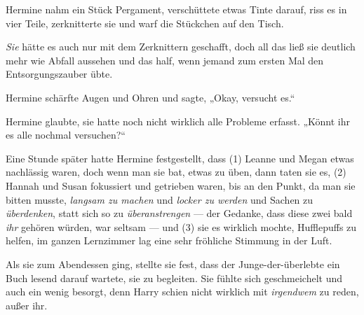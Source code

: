 Hermine nahm ein Stück Pergament, verschüttete etwas Tinte darauf, riss es in vier Teile, zerknitterte sie und warf die Stückchen auf den Tisch.

\emph{Sie} hätte es auch nur mit dem Zerknittern geschafft, doch all das ließ sie deutlich mehr wie Abfall aussehen und das half, wenn jemand zum ersten Mal den Entsorgungszauber übte.

Hermine schärfte Augen und Ohren und sagte,
„Okay, versucht es.“





Hermine glaubte, sie hatte noch nicht wirklich alle Probleme erfasst.
„Könnt ihr es alle nochmal versuchen?“

Eine Stunde später hatte Hermine festgestellt, dass (1) Leanne und Megan etwas nachlässig waren, doch wenn man sie bat, etwas zu üben, dann taten sie es, (2) Hannah und Susan fokussiert und getrieben waren, bis an den Punkt, da man sie bitten musste, \emph{langsam zu machen} und \emph{locker zu werden} und Sachen zu \emph{überdenken}, statt sich so zu \emph{überanstrengen} — der Gedanke, dass diese zwei bald \emph{ihr} gehören würden, war seltsam — und (3) sie es wirklich mochte, Hufflepuffs zu helfen, im ganzen Lernzimmer lag eine sehr fröhliche Stimmung in der Luft.

Als sie zum Abendessen ging, stellte sie fest, dass der Junge-der-überlebte ein Buch lesend darauf wartete, sie zu begleiten. Sie fühlte sich geschmeichelt und auch ein wenig besorgt, denn Harry schien nicht wirklich mit \emph{irgendwem} zu reden, außer ihr.

